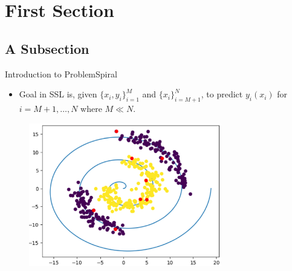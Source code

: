 \section{First Section}

\subsection{A Subsection}
	\begin{frame}{Introduction to Problem}{Spiral}
		\begin{itemize}
			\item Goal in SSL is, given $\{x_i,y_i\}_{i=1}^{M}$ and $\{x_i\}_{i=M+1}^{N}$, to predict $y_i(x_i)$ for $i=M+1, \dots , N$ where $M \ll N$.
		\end{itemize}
		\begin{figure}[H]
			\centering
			\hspace*{0cm}\includegraphics[width=0.75\textwidth,height=\textwidth,keepaspectratio]{Figures/SpiOg.png}
		\end{figure}
	\end{frame}

